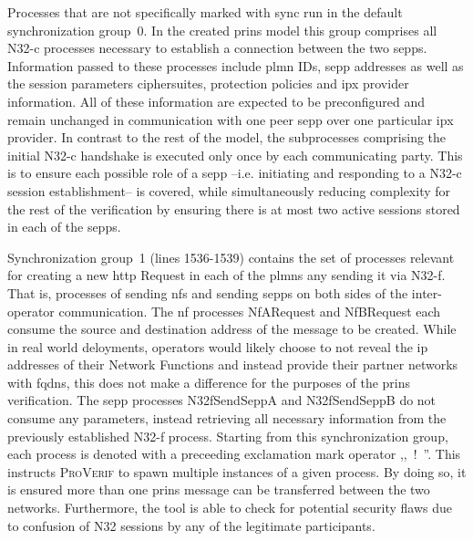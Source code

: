 Processes that are not specifically marked with {\sffamily sync} run in the default synchronization group~0.
In the created \gls{prins} model this group comprises all N32-c processes necessary to establish a connection between the two \glspl{sepp}.
Information passed to these processes include \gls{plmn} IDs, \gls{sepp} addresses as well as the session parameters ciphersuites, protection policies and \gls{ipx} provider information.
All of these information are expected to be preconfigured and remain unchanged in communication with one peer \gls{sepp} over one particular \gls{ipx} provider.
In contrast to the rest of the model, the subprocesses comprising the initial N32-c handshake is executed only once by each communicating party.
This is to ensure each possible role of a \gls{sepp} --i.e. initiating and responding to a N32-c session establishment-- is covered, while simultaneously reducing complexity for the rest of the verification by ensuring there is at most two active sessions stored in each of the \glspl{sepp}.

Synchronization group~1 (lines 1536-1539) contains the set of processes relevant for creating a new \gls{http} Request in each of the \glspl{plmn} any sending it via N32-f.
That is, processes of sending \glspl{nf} and sending \glspl{sepp} on both sides of the inter-operator communication.
The \gls{nf} processes {\sffamily NfARequest} and {\sffamily NfBRequest} each consume the source and destination address of the message to be created.
While in real world deloyments, operators would likely choose to not reveal the \gls{ip} addresses of their Network Functions and instead provide their partner networks with \glspl{fqdn}, this does not make a difference for the purposes of the \gls{prins} verification.
The \gls{sepp} processes {\sffamily N32fSendSeppA} and {\sffamily N32fSendSeppB} do not consume any parameters, instead retrieving all necessary information from the previously established N32-f process.
Starting from this synchronization group, each process is denoted with a preceeding exclamation mark operator ,,~{\sffamily !}~''.
This instructs \textsc{ProVerif} to spawn multiple instances of a given process.
By doing so, it is ensured more than one \gls{prins} message can be transferred between the two networks.
Furthermore, the tool is able to check for potential security flaws due to confusion of N32 sessions by any of the legitimate participants.

